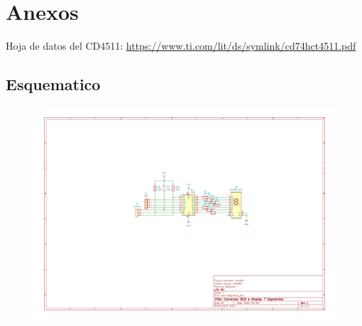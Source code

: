 \chapter{Anexos}
  Hoja de datos del CD4511: \url{https://www.ti.com/lit/ds/symlink/cd74hct4511.pdf}
  \begin{landscape}
    \pagestyle{empty}
    \section{Esquematico}\label{annex:schematic}
      \begin{figure}[!ht]
      \centering
        \includegraphics[height=.9\textwidth]{annex/bcd-7seg_sch.pdf}
      \end{figure}
  \end{landscape}
